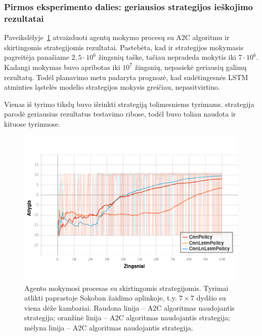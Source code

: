\documentclass{VUMIFPSbakalaurinis}
\begin{document}
\subsubsection{Pirmos eksperimento dalies: geriausios strategijos ieškojimo rezultatai}
{
	Paveikslėlyje~\ref{img:policies_graph} atvaizduoti agentų mokymo procesų su A2C algoritmu ir skirtingomis strategijomis rezultatai. Pastebėta, kad  ir  strategijos mokymasis pagreitėja panašiame \(2,5\cdot10^6\) žingsnių taške, tačiau  nepradeda mokytis iki \(7\cdot10^6\). Kadangi mokymas buvo apribotas iki \(10^7\) žingsnių,  nepasiekė geriausių galimų rezultatų. Todėl planavimo metu padaryta prognozė, kad sudėtingesnės LSTM atminties ląstelės modelio strategijos mokysis greičiau, nepasitvirtino.\par
	
	Vienas iš tyrimo tikslų buvo išrinkti strategiją tolimesniems tyrimams.  strategija parodė geriausius rezultatus testavimo ribose, todėl buvo toliau naudota ir kituose tyrimuose.
	
	\begin{figure}[H]
		\centering
		\includegraphics[scale=0.75]{img/graphs/policies}
		\caption{Agento mokymosi procesas su skirtingomis strategijomis. Tyrimai atlikti paprastoje Sokoban žaidimo aplinkoje, t.y. \(7 \times 7\) dydžio su viena dėže kambariai. Raudona linija -- A2C algoritmas naudojantis  strategija; oranžinė linija -- A2C algoritmas naudojantis  strategija; mėlyna linija -- A2C algoritmas naudojantis  strategija.}
		\label{img:policies_graph}
	\end{figure}
}
\end{document}
